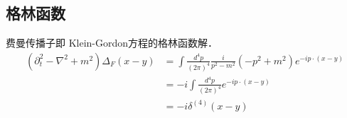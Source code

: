 \subsection{格林函数} 
费曼传播子即 Klein-Gordon方程的格林函数解．
\begin{equation}
\begin{aligned}
\left(\partial_{t}^{2}-\nabla^{2}+m^{2}\right) \Delta_{F}(x-y) &=\int \frac{d^{4} p}{(2 \pi)^{4}} \frac{i}{p^{2}-m^{2}}\left(-p^{2}+m^{2}\right) e^{-i p \cdot(x-y)} \\
&=-i \int \frac{d^{4} p}{(2 \pi)^{4}} e^{-i p \cdot(x-y)} \\
&=-i \delta^{(4)}(x-y)
\end{aligned}
\end{equation}
